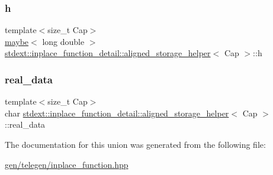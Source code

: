 \mbox{\label{unionstdext_1_1inplace__function__detail_1_1aligned__storage__helper_a790aee0f127912bcebca554a2cc75395}} 
\subsubsection{\texorpdfstring{h}{h}}
{\footnotesize\ttfamily template$<$size\+\_\+t Cap$>$ \\
\hyperlink{unionstdext_1_1inplace__function__detail_1_1aligned__storage__helper_a8265d2d65d57b5e7de088f8b6fc02370}{maybe}$<$ long double $>$ \hyperlink{unionstdext_1_1inplace__function__detail_1_1aligned__storage__helper}{stdext\+::inplace\+\_\+function\+\_\+detail\+::aligned\+\_\+storage\+\_\+helper}$<$ Cap $>$\+::h}

\mbox{\label{unionstdext_1_1inplace__function__detail_1_1aligned__storage__helper_ae41b7c85be0b0ea99933e3c615864df0}} 
\subsubsection{\texorpdfstring{real\+\_\+data}{real\_data}}
{\footnotesize\ttfamily template$<$size\+\_\+t Cap$>$ \\
char \hyperlink{unionstdext_1_1inplace__function__detail_1_1aligned__storage__helper}{stdext\+::inplace\+\_\+function\+\_\+detail\+::aligned\+\_\+storage\+\_\+helper}$<$ Cap $>$\+::real\+\_\+data}



The documentation for this union was generated from the following file\+:\begin{DoxyCompactItemize}
\item 
\hyperlink{gen_2telegen_2inplace__function_8hpp}{gen/telegen/inplace\+\_\+function.\+hpp}\end{DoxyCompactItemize}
